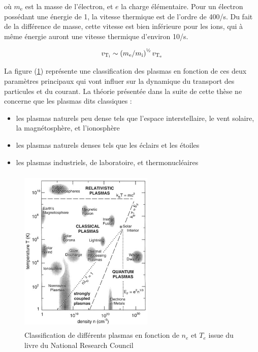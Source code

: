 \begin{refsection}
où $m_\text{e}$ est la masse de l'électron, et $e$ la charge élémentaire. Pour un électron possédant
une énergie de \unit{1}{\electronvolt}, la vitesse thermique est de l'ordre de
\unit{400}{\kilo\meter}/s.
Du fait de la différence de masse, cette vitesse est bien inférieure pour les
ions, qui à même énergie auront une vitesse thermique d'environ
\unit{10}{\kilo\meter}/s.

\begin{equation}
	v_{\text{T}_\text{i}}\sim\left(m_\text{e}/m_\text{i}\right)^{\text{\textonehalf}}
	v_{\text{T}_\text{e}}
\end{equation}

La figure (\ref{zoologie}) représente une classification des plasmas
en fonction de ces deux paramètres principaux qui vont influer sur la dynamique du
transport des particules et du courant.
La théorie présentée dans la suite de cette thèse ne concerne que les plasmas
dits classiques :

\begin{itemize}
  \item les plasmas naturels peu dense tels que l'espace interstellaire,
  le vent solaire, la magnétosphère, et l'ionosphère
  \item les plasmas naturels denses tels que les éclairs et les étoiles
  \item les plasmas industriels, de laboratoire, et thermonucléaires
\end{itemize}

\begin{figure}[htbp]
\centering
\includegraphics[height=80mm,width=64mm]{figures/zoologie.png}{\caption{Classification
de différents plasmas en fonction de $n_e$ et $T_e$ issue du livre du National
Research Council \parencite{NRC}}\label{zoologie}}
\end{figure}


\end{refsection}
